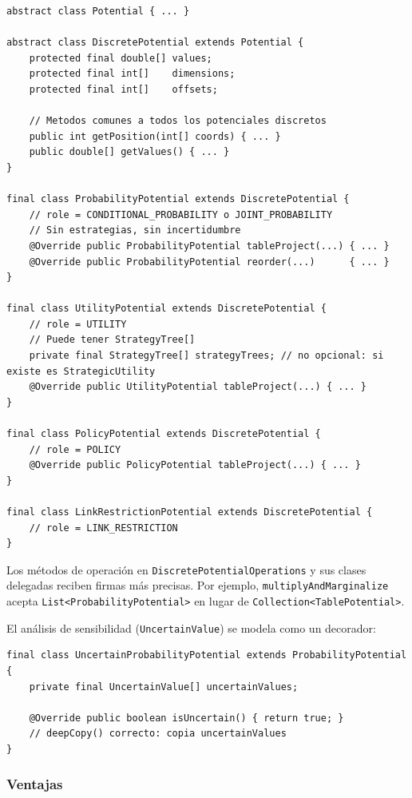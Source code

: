 \documentclass[11pt,a4paper]{article}
\newcommand{\code}[1]{\texttt{#1}}
\begin{document}
\begin{lstlisting}[caption={Jerarquía resultante de la Opción 2}]
abstract class Potential { ... }

abstract class DiscretePotential extends Potential {
    protected final double[] values;
    protected final int[]    dimensions;
    protected final int[]    offsets;

    // Metodos comunes a todos los potenciales discretos
    public int getPosition(int[] coords) { ... }
    public double[] getValues() { ... }
}

final class ProbabilityPotential extends DiscretePotential {
    // role = CONDITIONAL_PROBABILITY o JOINT_PROBABILITY
    // Sin estrategias, sin incertidumbre
    @Override public ProbabilityPotential tableProject(...) { ... }
    @Override public ProbabilityPotential reorder(...)      { ... }
}

final class UtilityPotential extends DiscretePotential {
    // role = UTILITY
    // Puede tener StrategyTree[]
    private final StrategyTree[] strategyTrees; // no opcional: si existe es StrategicUtility
    @Override public UtilityPotential tableProject(...) { ... }
}

final class PolicyPotential extends DiscretePotential {
    // role = POLICY
    @Override public PolicyPotential tableProject(...) { ... }
}

final class LinkRestrictionPotential extends DiscretePotential {
    // role = LINK_RESTRICTION
}
\end{lstlisting}

Los métodos de operación en \code{DiscretePotentialOperations} y sus clases
delegadas reciben firmas más precisas.  Por ejemplo, \code{multiplyAndMarginalize}
acepta \code{List<ProbabilityPotential>} en lugar de
\code{Collection<TablePotential>}.

El análisis de sensibilidad (\code{UncertainValue}) se modela como un decorador:

\begin{lstlisting}[caption={Decorador para incertidumbre de modelo}]
final class UncertainProbabilityPotential extends ProbabilityPotential {
    private final UncertainValue[] uncertainValues;

    @Override public boolean isUncertain() { return true; }
    // deepCopy() correcto: copia uncertainValues
}
\end{lstlisting}

\subsubsection*{Ventajas}
\end{document}
